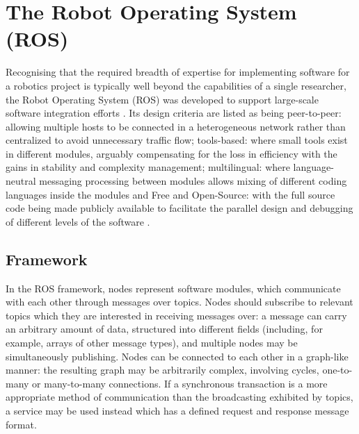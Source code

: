 \section{The Robot Operating System (ROS)}

Recognising that the required breadth of expertise for implementing software for a robotics
project is typically well beyond the capabilities of a single researcher, the Robot Operating
System (ROS) was developed to support large-scale software integration efforts \cite{quigley2009ros}. Its design criteria are listed as being peer-to-peer: allowing multiple hosts to be connected in a heterogeneous network rather than centralized to avoid unnecessary traffic flow; tools-based: where
small tools exist in different modules, arguably compensating for the loss in efficiency with the
gains in stability and complexity management; multilingual: where language-neutral messaging processing between modules allows mixing of different coding languages inside the modules and Free and Open-Source: with the full source code being made publicly available to facilitate the parallel design and debugging of different levels of the software \cite{quigley2009ros}.


\subsection{Framework}
In the ROS framework, nodes represent software modules, which communicate with each other
through messages over topics. Nodes should subscribe to relevant topics which they are interested in receiving messages over: a message can carry an arbitrary amount of data, structured into different fields (including, for example, arrays of other message types), and multiple nodes may be simultaneously publishing. Nodes can be connected to each other in a graph-like manner: the resulting graph may be arbitrarily complex, involving cycles, one-to-many or many-to-many connections. If a synchronous transaction is a more appropriate method of communication than the broadcasting exhibited by topics, a service may be used instead which has a defined request and response message format.

